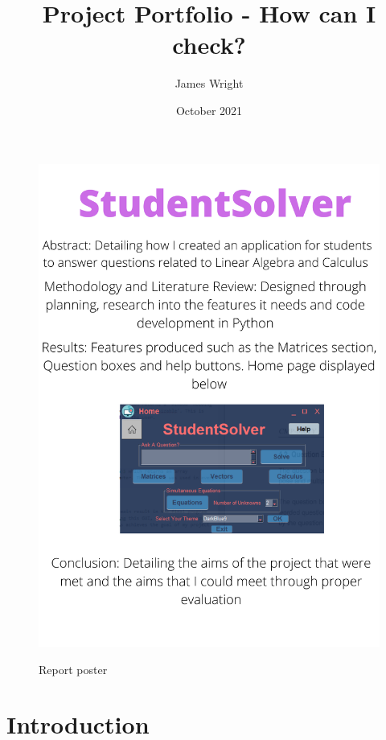 \documentclass[final]{cmpreport}
\title{Project Portfolio - How can I check?}
\author{James Wright }
\date{October 2021}
\begin{document}
			\begin{figure}[H]
		\caption{Report poster}
		\centering
		\includegraphics[scale=0.3]{poster.png}
		\label{fig:poster}
	\end{figure}
	\section{Introduction} \label{sec:intro}
	
\end{document}
